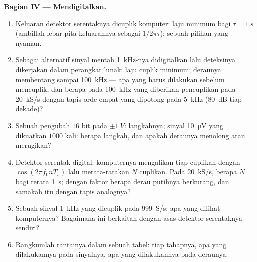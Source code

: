 \begin{problem}
\medskip
\noindent\textbf{Bagian IV --- Mendigitalkan.}
\begin{enumerate}[resume]
  \item Keluaran detektor serentaknya dicuplik komputer: laju minimum bagi
        $\tau = \qty{1}{s}$ (ambillah lebar pita keluarannya sebagai $1/2\pi\tau$); sebuah
        pilihan yang nyaman.
  \item Sebagai alternatif sinyal mentah \qty{1}{kHz}-nya didigitalkan lalu
        deteksinya dikerjakan dalam perangkat lunak: laju cuplik minimum; deraunya
        membentang sampai \qty{100}{kHz} --- apa yang harus dilakukan sebelum mencuplik,
        dan  berapa pada \qty{100}{kHz} yang diberikan pencuplikan pada
        \qty{20}{kS/s} dengan tapis orde empat yang dipotong pada \qty{5}{kHz}
        (\qty{80}{dB} tiap dekade)?
  \item Sebuah pengubah $16$ bit pada $\pm\qty{1}{V}$: langkahnya; sinyal \qty{10}{\micro V}
        yang dikuatkan $1000$ kali: berapa langkah, dan apakah deraunya
        menolong atau merugikan?
  \item Detektor serentak digital: komputernya mengalikan tiap cuplikan dengan
        $\cos(2\pi f_0nT_s)$ lalu merata-ratakan $N$ cuplikan. Pada \qty{20}{kS/s},
        berapa $N$ bagi rerata \qty{1}{s}; dengan faktor berapa derau putihnya
        berkurang, dan samakah itu dengan tapis analognya?
  \item Sebuah sinyal \qty{1}{kHz} yang dicuplik pada \qty{999}{S/s}: apa yang dilihat
        komputernya? Bagaimana ini berkaitan dengan asas detektor
        serentaknya sendiri?
  \item Rangkumlah rantainya dalam sebuah tabel: tiap tahapnya, apa yang dilakukannya pada
        sinyalnya, apa yang dilakukannya pada deraunya.
\end{enumerate}
\end{problem}
